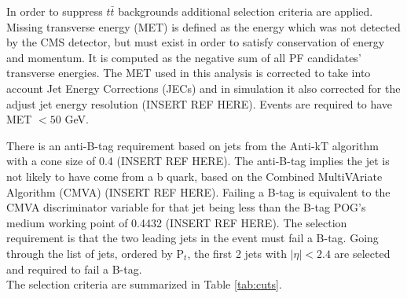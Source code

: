 \documentclass[
    10pt, %
    a4paper, %
    oneside, %
    headinclude,footinclude, %
    BCOR5mm, %
]{scrartcl}
\begin{document}
    In order to suppress $t \bar{t}$ backgrounds additional selection criteria are applied. 
    Missing transverse energy (MET) is defined as the energy which was not detected by the CMS 
    detector, but must exist in order to satisfy conservation of energy and momentum. 
    It is computed as the negative sum of all PF candidates' transverse 
    energies. The MET used in this analysis is corrected to take into account Jet Energy Corrections
    (JECs) and in simulation it also corrected for the adjust jet energy resolution (INSERT REF HERE). 
    Events are required to have MET $ < 50 $ GeV.

    There is an anti-B-tag requirement based on jets from the Anti-kT 
    algorithm with a cone size of 0.4 (INSERT REF HERE). 
    The anti-B-tag implies the jet is not likely to have come from a b quark, based on the Combined MultiVAriate Algorithm (CMVA) (INSERT REF HERE).
    Failing a B-tag is equivalent to the CMVA discriminator variable for that jet being less than the B-tag POG's medium working point of 0.4432 (INSERT REF HERE).
    The selection requirement is that the two leading jets in the event must fail a B-tag. 
    Going through the list of jets, ordered by P$_t$, the first 2 jets with $|\eta| < 2.4$ are selected and required to fail a B-tag. \\

    The selection criteria are summarized in Table \ref{tab:cuts}. \\
\end{document}

